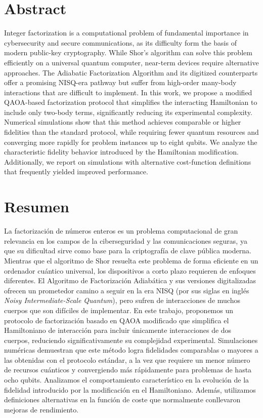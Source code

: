 \chapter*{Abstract}

Integer factorization is a computational problem of fundamental importance in cybersecurity and secure communications, as its difficulty form the basis of modern public-key cryptography. While Shor's algorithm can solve this problem efficiently on a universal quantum computer, near-term devices require alternative approaches. The Adiabatic Factorization Algorithm and its digitized counterparts offer a promising NISQ-era pathway but suffer from high-order many-body interactions that are difficult to implement. In this work, we propose a modified QAOA-based factorization protocol that simplifies the interacting Hamiltonian to include only two-body terms, significantly reducing its experimental complexity. Numerical simulations show that this method achieves comparable or higher fidelities than the standard protocol, while requiring fewer quantum resources and converging more rapidly for problem instances up to eight qubits. We analyze the characteristic fidelity behavior introduced by the Hamiltonian modification. Additionally, we report on simulations with alternative cost-function definitions that frequently yielded improved performance.

\chapter*{Resumen}

\noindent La factorización de números enteros es un problema computacional de gran relevancia en los campos de la ciberseguridad y las comunicaciones seguras, ya que su dificultad sirve como base para la criptografía de clave pública moderna. Mientras que el algoritmo de Shor resuelta este problema de forma eficiente en un ordenador cuántico universal, los dispositivos a corto plazo requieren de enfoques diferentes. El Algoritmo de Factorización Adiabática y sus versiones digitalizadas ofrecen un prometedor camino a seguir en la era NISQ (por sus siglas en inglés \textit{Noisy Intermediate-Scale Quantum}), pero sufren de interacciones de muchos cuerpos que son difíciles de implementar. En este trabajo, proponemos un protocolo de factorización basado en QAOA modificado que simplifica el Hamiltoniano de interacción para incluir únicamente interacciones de dos cuerpos, reduciendo significativamente su complejidad experimental. Simulaciones numéricas demuestran que este método logra fidelidades comparablas o mayores a las obtenidas con el protocolo estándar, a la vez que requiere un menor número de recursos cuánticos y convergiendo más rápidamente para problemas de hasta ocho qubits. Analizamos el comportamiento característico en la evolución de la fidelidad introducido por la modificación en el Hamiltoniano. Además, utilizamos definiciones alternativas en la función de coste que normalmente conllevaron mejoras de rendimiento.